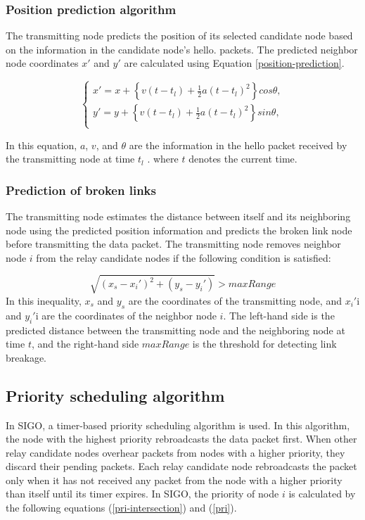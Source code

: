 \documentclass[conference]{IEEEtran}
\begin{document}
\subsubsection{Position prediction algorithm}

The transmitting node predicts the position of its selected candidate  node based on the information in the candidate node's hello.
packets. 
The predicted neighbor node coordinates $x'$ and $y'$ are calculated using Equation \ref{position-prediction}.

\begin{equation}
\label{position-prediction}
\begin{cases}
x' = x + \left\{v(t-t_l) + \frac{1}{2}a(t-t_l)^2\right\}cos\theta, \\
y' = y + \left\{v(t-t_l) + \frac{1}{2}a(t-t_l)^2\right\}sin\theta, \\
\end{cases}
\end{equation}

In this equation, $a$, $v$, and $\theta$ are the information in the hello packet received by the transmitting node at time $t_l$ . where $t$ denotes the current time.

\subsubsection{Prediction of broken links}
The transmitting node estimates the distance between itself and its neighboring node using the predicted position information and predicts the broken link node before transmitting the data packet. The transmitting node removes neighbor node $i$ from the relay candidate nodes if the following condition is satisfied:


\begin{equation}
\label{expired_links}
\sqrt{\left(x_s - x_i'\right)^2 + \left(y_s - y_i'\right)} > maxRange
\end{equation}
In this inequality, $x_s$ and  $y_s$ are the coordinates of the  transmitting node, and $x_i'$i and $y_i'$i are the coordinates of the neighbor node $i$.
The left-hand side is the predicted distance between the transmitting node and the neighboring node at time $t$, and the right-hand side $maxRange$ is the threshold for detecting link breakage.


\subsection{Priority scheduling algorithm}
\label{priority}
In SIGO, a timer-based priority scheduling algorithm is used. 
In this algorithm, the node with the highest priority rebroadcasts the data packet first. 
When other relay candidate nodes overhear packets from nodes with a higher priority, they discard their pending packets. Each relay candidate node rebroadcasts the packet only when it has not received any packet from the node with a higher priority than itself until its timer expires.
In SIGO, the priority of node $i$ is calculated by the following equations (\ref{pri-intersection}) and (\ref{pri}).
\end{document}
